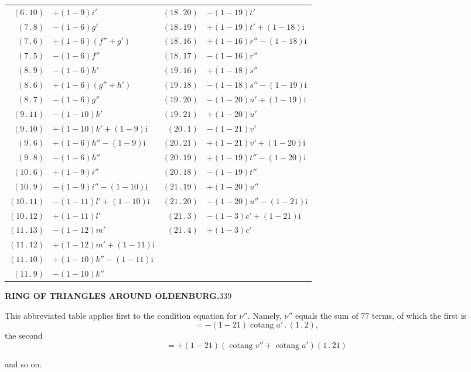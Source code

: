 \begin{center}
\begin{tabular}{|r|l||r|l|}
\((6\,.\,10)\)&\(+(1-9)i'\)&\((18\,.\,20)\)&\(-(1-19)t'\)\\
\((7\,.\,8)\)&\(-(1-6)g'\)&\((18\,.\,19)\)&\(+(1-19)t'+(1-18)\mathrm{i}\)\\
\((7\,.\,6)\)&\(+(1-6)(f''+g')\)&\((18\,.\,16)\)&\(+(1-16)r''-(1-18)\mathrm{i}\)\\
\((7\,.\,5)\)&\(-(1-6)f''\)&\((18\,.\,17)\)&\(-(1-16)r''\)\\
\((8\,.\,9)\)&\(-(1-6)h'\)&\((19\,.\,16)\)&\(+(1-18)s''\)\\
\((8\,.\,6)\)&\(+(1-6)(g''+h')\)&\((19\,.\,18)\)&\(-(1-18)s''-(1-19)\mathrm{i}\)\\
\((8\,.\,7)\)&\(-(1-6)g''\)&\((19\,.\,20)\)&\(-(1-20)u'+(1-19)\mathrm{i}\)\\
\((9\,.\,11)\)&\(-(1-10)k'\)&\((19\,.\,21)\)&\(+(1-20)u'\)\\
\((9\,.\,10)\)&\(+(1-10)k'+(1-9)\mathrm{i}\)&\((20\,.\,1)\)&\(-(1-21)v'\)\\
\((9\,.\,6)\)&\(+(1-6)h''-(1-9)\mathrm{i}\)&\((20\,.\,21)\)&\(+(1-21)v'+(1-20)\mathrm{i}\)\\
\((9\,.\,8)\)&\(-(1-6)h''\)&\((20\,.\,19)\)&\(+(1-19)t''-(1-20)\mathrm{i}\)\\
\((10\,.\,6)\)&\(+(1-9)i''\)&\((20\,.\,18)\)&\(-(1-19)t''\)\\
\((10\,.\,9)\)&\(-(1-9)i''-(1-10)\mathrm{i}\)&\((21\,.\,19)\)&\(+(1-20)u''\)\\
\((10\,.\,11)\)&\(-(1-11)l'+(1-10)\mathrm{i}\)&\((21\,.\,20)\)&\(-(1-20)u''-(1-21)\mathrm{i}\)\\
\((10\,.\,12)\)&\(+(1-11)l'\)&\((21\,.\,3)\)&\(-(1-3)c'+(1-21)\mathrm{i}\)\\
\((11\,.\,13)\)&\(-(1-12)m'\)&\((21\,.\,4)\)&\(+(1-3)c'\)\\
\((11\,.\,12)\)&\(+(1-12)m'+(1-11)\mathrm{i}\)&&\\
\((11\,.\,10)\)&\(+(1-10)k''-(1-11)\mathrm{i}\)&&\\
\((11\,.\,9)\)&\(-(1-10)k''\)&&\\
\end{tabular}
\end{center}
\endgroup
\clearpage
\noindent\textbf{RING OF TRIANGLES AROUND OLDENBURG.}\hfill339\par\medskip
\par This abbreviated table applies first to the condition equation for \(\nu''\). Namely, \(\nu''\) equals the sum of 77 terms, of which the first is
\[
=-(1-21)\operatorname{cotang}a'\,.\,(1\,.\,2),
\]
\noindent the second
\[
=+(1-21)(\operatorname{cotang}v''+\operatorname{cotang}a')(1\,.\,21)
\]
\begin{center}and so on.\end{center}

